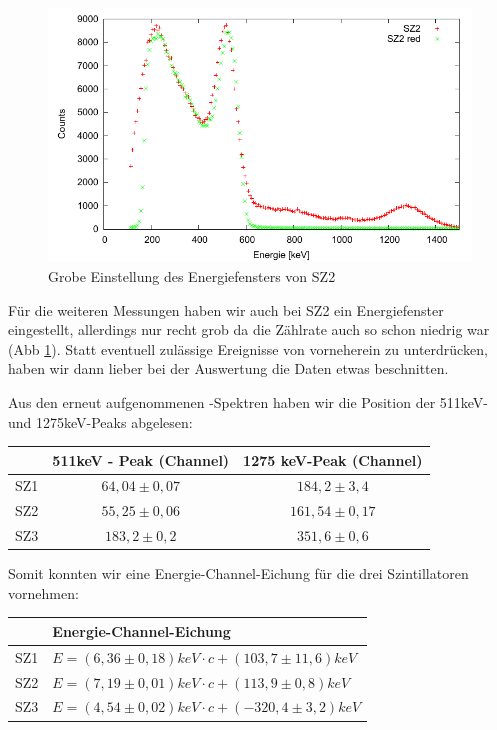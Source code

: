 
\begin{figure}[H]
\includegraphics[width=\textwidth]{Graphen/3er/red-spektrum-sz2.pdf}
 \caption{Grobe Einstellung des Energiefensters von SZ2}
\label{graphen-3er-red-spektrum-sz2}
\end{figure}

Für die weiteren Messungen haben wir auch bei SZ2 ein Energiefenster eingestellt, allerdings nur recht grob da die Zählrate auch so schon niedrig war (Abb \ref{graphen-3er-red-spektrum-sz2}). Statt eventuell zulässige Ereignisse von vorneherein zu unterdrücken, haben wir dann lieber bei der Auswertung die Daten etwas beschnitten.

Aus den erneut aufgenommenen \Na-Spektren haben wir die Position der 511keV- und 1275keV-Peaks abgelesen:  
\begin{center}
\begin{tabular}{lcc}
\toprule
 & 511keV - Peak (Channel) & 1275 keV-Peak (Channel) \\
\midrule
SZ1 & $64,04 \pm 0,07$ & $184,2 \pm 3,4$ \\
SZ2 & $55,25 \pm 0,06$ & $161,54 \pm 0,17$ \\
SZ3 & $183,2 \pm 0,2$ & $351,6 \pm 0,6$ \\
\bottomrule 
\end{tabular}
\end{center}

Somit konnten wir eine Energie-Channel-Eichung für die drei Szintillatoren vornehmen:

\begin{center}
\begin{tabular}{ll}
\toprule
     & Energie-Channel-Eichung\\
\midrule
 SZ1 & $E = (6,36 \pm 0,18) keV \cdot c + (103,7 \pm 11,6) keV$\\
 SZ2 & $E = (7,19 \pm 0,01) keV \cdot c + (113,9 \pm 0,8) keV$\\
 SZ3 & $E = (4,54 \pm 0,02) keV \cdot c + (-320,4 \pm 3,2) keV$\\
\bottomrule 
\end{tabular}
\end{center}

